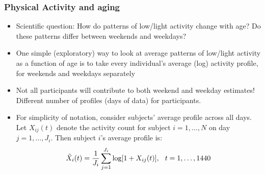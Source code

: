 \documentclass[10pt]{beamer}\usepackage[]{graphicx}\usepackage[]{color}
\begin{document}
\begin{frame}
\frametitle{Physical Activity and aging}
\begin{itemize}
\item Scientific question: How do patterns of low/light activity change with age? Do these patterns differ between weekends and weekdays? \pause
\item One simple (exploratory) way to look at average patterns of low/light activity as a function of age is to take every individual's average (log) activity profile, for weekends and weekdays separately 
\item Not all participants will contribute to both weekend and weekday estimates! Different number of profiles (days of data) for participants.
\item For simplicity of notation, consider subjects' average profile across all days. 
Let $X_{ij}(t)$ denote the activity count for subject $i = 1,\ldots,N$ on day $j = 1,\ldots,J_i$. 
Then subject $i$'s average profile is: 
    \begin{align*}
    \tilde{X}_i(t) = \frac{1}{J_i}\sum_{j=1}^{J_i} \log[1+X_{ij}(t)], \hspace{0.25cm} t = 1,\ldots,1440
    \end{align*}

\end{itemize}
\end{frame}
\end{document}
